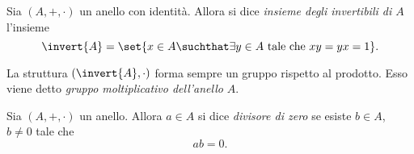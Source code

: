 \begin{definition} 
    \label{def:invertibili}
    Sia $(A, +, \cdot)$ un anello con identità. Allora si dice \emph{insieme degli invertibili di $A$} l'insieme \[
        \invert{A} = \set{x \in A \suchthat \exists y \in A \text{ tale che } xy = yx = 1}.
    \]
\end{definition}

\begin{remark}
    La struttura $(\invert{A}, \cdot)$ forma sempre un gruppo rispetto al prodotto. Esso viene detto \emph{gruppo moltiplicativo dell'anello} $A$.
\end{remark}

\begin{definition}
    \label{def:div_zero}
    Sia $(A, +, \cdot)$ un anello. Allora $a \in A$ si dice \emph{divisore di zero} se esiste $b \in A$, $b \neq 0$ tale che \[
        ab = 0.
    \]
\end{definition}

